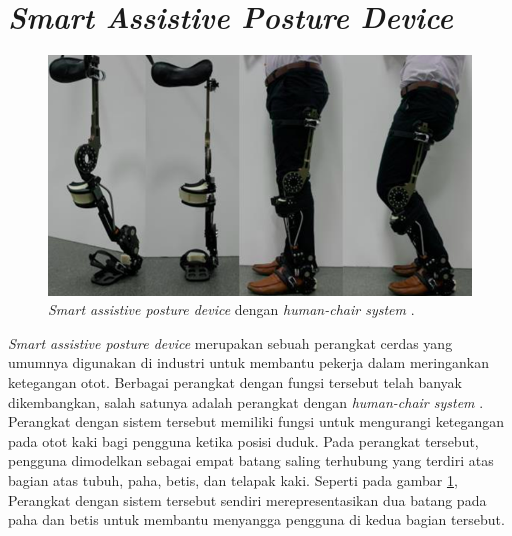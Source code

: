\section{\emph{Smart Assistive Posture Device}}
\label{sec:posturedevice}

\begin{figure}[ht]
  \centering
  \includegraphics[scale=0.3]{gambar/contoh-posture-device.png}
  \caption{\emph{Smart assistive posture device} dengan \emph{human-chair system} \citep{cit:choi2015}.}
  \label{fig:contohposturedevice}
\end{figure}

\emph{Smart assistive posture device} merupakan sebuah perangkat cerdas yang umumnya digunakan di industri untuk membantu pekerja dalam meringankan ketegangan otot.
Berbagai perangkat dengan fungsi tersebut telah banyak dikembangkan,
  salah satunya adalah perangkat dengan \emph{human-chair system} \citep{cit:choi2015}.
Perangkat dengan sistem tersebut memiliki fungsi untuk mengurangi ketegangan pada otot kaki bagi pengguna ketika posisi duduk.
Pada perangkat tersebut,
  pengguna dimodelkan sebagai empat batang saling terhubung yang terdiri atas bagian atas tubuh, paha, betis, dan telapak kaki.
Seperti pada gambar \ref{fig:contohposturedevice},
  Perangkat dengan sistem tersebut sendiri merepresentasikan dua batang pada paha dan betis untuk membantu menyangga pengguna di kedua bagian tersebut.
